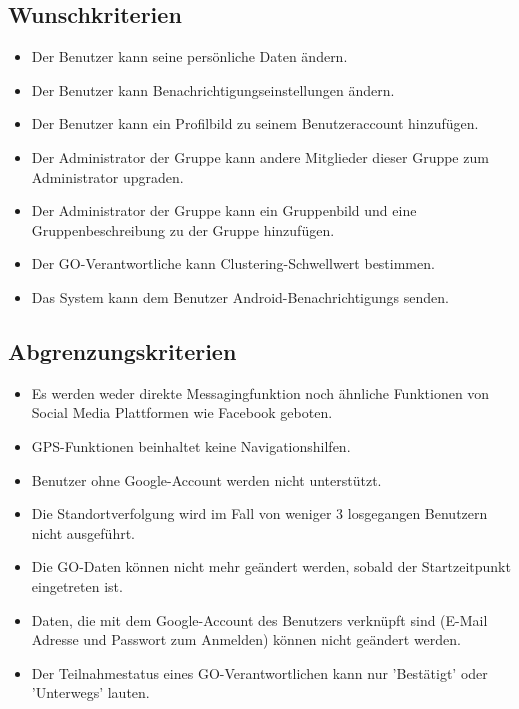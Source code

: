 \documentclass[parskip=full]{scrartcl}
\begin{document}
\subsection{Wunschkriterien}
\begin{itemize}
	\item Der Benutzer kann seine persönliche Daten ändern.
	\item Der Benutzer kann Benachrichtigungseinstellungen ändern.
	\item Der Benutzer kann ein Profilbild zu seinem Benutzeraccount hinzufügen. %
	\item Der Administrator der Gruppe kann andere Mitglieder dieser Gruppe zum Administrator upgraden.
	\item Der Administrator der Gruppe kann ein Gruppenbild und eine Gruppenbeschreibung zu der Gruppe hinzufügen.
	\item Der GO-Verantwortliche kann Clustering-Schwellwert bestimmen.
	\item Das System kann dem Benutzer \glspl{Android-Benachrichtigung} senden.
\end{itemize}

\subsection{Abgrenzungskriterien}
\begin{itemize}
\item Es werden weder direkte Messagingfunktion noch ähnliche Funktionen von Social Media Plattformen wie Facebook geboten.
\item GPS-Funktionen beinhaltet keine Navigationshilfen.
\item Benutzer ohne Google-Account werden nicht unterstützt.
\item Die Standortverfolgung wird im Fall von weniger 3 losgegangen Benutzern nicht ausgeführt. %
\item Die GO-Daten können nicht mehr geändert werden, sobald der Startzeitpunkt eingetreten ist.
\item Daten, die mit dem Google-Account des Benutzers verknüpft sind (E-Mail Adresse und Passwort zum Anmelden) können nicht geändert werden.
\item Der Teilnahmestatus eines GO-Verantwortlichen kann nur 'Bestätigt' oder 'Unterwegs' lauten.
\end{itemize}
\end{document}
